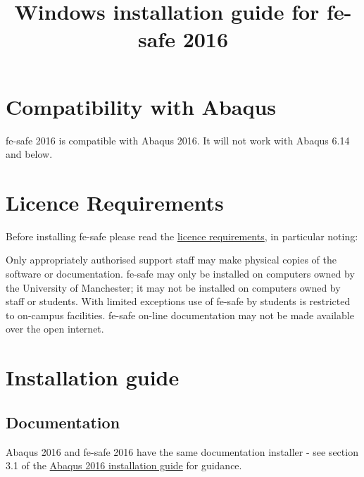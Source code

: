 \documentclass[10pt,a4paper]{article}
\title{Windows installation guide for fe-safe 2016}
\date{} %
\begin{document}
	\maketitle
	
	\section*{Compatibility with Abaqus}
	fe-safe 2016 is compatible with Abaqus 2016. It will not work with Abaqus 6.14 and below.
	
	\section{Licence Requirements}
	Before installing fe-safe please read the \href{https://www.applications.itservices.manchester.ac.uk/show_product.php?id=338&tab=licensing}{licence requirements}, in particular noting:
	
	Only appropriately authorised support staff may make physical copies of the software or documentation.
	fe-safe may only be installed on computers owned by the University of Manchester; it may not be installed on computers owned by staff or students.
	With limited exceptions use of fe-safe by students is restricted to on-campus facilities.
	fe-safe on-line documentation may not be made available over the open internet.
	
	
	\section{Installation guide}
	\subsection{Documentation}
	Abaqus 2016 and fe-safe 2016 have the same documentation installer - see section 3.1 of the  \href{https://www.applications.itservices.manchester.ac.uk/medialibrary/docs/Abaqus/abaqus2016_windows_installation_guide.pdf}{Abaqus 2016 installation guide} for guidance. 
	
	
\end{document}
